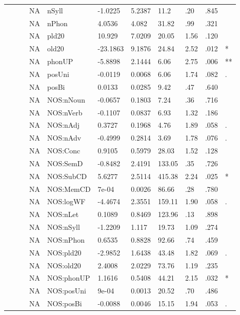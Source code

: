 \begin{table}[ht]
\begin{tabular}{lllllllllll}
   &  &  & NA & nSyll & -1.0225 & 5.2387 & 11.2 & .20 & .845 &   \\ 
   &  &  & NA & nPhon & 4.0536 & 4.082 & 31.82 & .99 & .321 &   \\ 
   &  &  & NA & pld20 & 10.929 & 7.0209 & 20.05 & 1.56 & .120 &   \\ 
   &  &  & NA & old20 & -23.1863 & 9.1876 & 24.84 & 2.52 & .012 & * \\ 
   &  &  & NA & phonUP & -5.8898 & 2.1444 & 6.06 & 2.75 & .006 & ** \\ 
   &  &  & NA & posUni & -0.0119 & 0.0068 & 6.06 & 1.74 & .082 & . \\ 
   &  &  & NA & posBi & 0.0133 & 0.0285 & 9.42 & .47 & .640 &   \\ 
   &  &  & NA & NOS:nNoun & -0.0657 & 0.1803 & 7.24 & .36 & .716 &   \\ 
   &  &  & NA & NOS:nVerb & -0.1107 & 0.0837 & 6.93 & 1.32 & .186 &   \\ 
   &  &  & NA & NOS:nAdj & 0.3727 & 0.1968 & 4.76 & 1.89 & .058 & . \\ 
   &  &  & NA & NOS:nAdv & -0.4999 & 0.2814 & 3.69 & 1.78 & .076 & . \\ 
   &  &  & NA & NOS:Conc & 0.9105 & 0.5979 & 28.03 & 1.52 & .128 &   \\ 
   &  &  & NA & NOS:SemD & -0.8482 & 2.4191 & 133.05 & .35 & .726 &   \\ 
   &  &  & NA & NOS:SubCD & 5.6277 & 2.5114 & 415.38 & 2.24 & .025 & * \\ 
   &  &  & NA & NOS:MemCD & 7e-04 & 0.0026 & 86.66 & .28 & .780 &   \\ 
   &  &  & NA & NOS:logWF & -4.4674 & 2.3551 & 159.11 & 1.90 & .058 & . \\ 
   &  &  & NA & NOS:nLet & 0.1089 & 0.8469 & 123.96 & .13 & .898 &   \\ 
   &  &  & NA & NOS:nSyll & -1.2209 & 1.117 & 19.73 & 1.09 & .274 &   \\ 
   &  &  & NA & NOS:nPhon & 0.6535 & 0.8828 & 92.66 & .74 & .459 &   \\ 
   &  &  & NA & NOS:pld20 & -2.9852 & 1.6438 & 43.48 & 1.82 & .069 & . \\ 
   &  &  & NA & NOS:old20 & 2.4008 & 2.0229 & 73.76 & 1.19 & .235 &   \\ 
   &  &  & NA & NOS:phonUP & 1.1616 & 0.5408 & 44.21 & 2.15 & .032 & * \\ 
   &  &  & NA & NOS:posUni & 9e-04 & 0.0013 & 20.52 & .70 & .486 &   \\ 
   &  &  & NA & NOS:posBi & -0.0088 & 0.0046 & 15.15 & 1.94 & .053 & . \\ 

\end{tabular}
\end{table}
